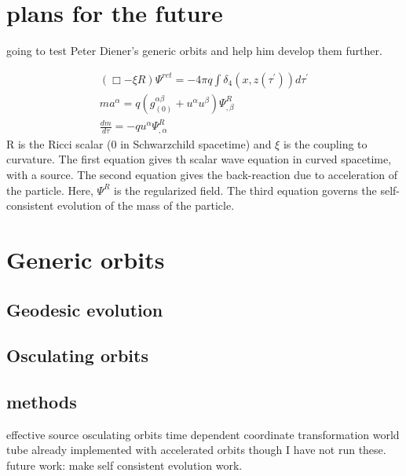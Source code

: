 \section{plans for the future}
going to test Peter Diener's generic orbits and help him develop them further.

\begin{eqnarray}
  (\Box - \xi R)\Psi^{ret} = -4\pi q \int\delta_4(x,z(\tau^\prime))d\tau^\prime\\
    ma^\alpha=q(g^{\alpha\beta}_{(0)}+u^\alpha u^\beta)\Psi^{R}_{,\beta}\\
    \frac{dm}{d\tau}=-q u^\alpha\Psi^R_{,\alpha}
\end{eqnarray}
R is the Ricci scalar (0 in Schwarzchild spacetime) and $\xi$ is the coupling to curvature. The first equation gives th scalar wave equation in curved spacetime, with a source. The second equation gives the back-reaction due to acceleration of the particle. Here, $\Psi^R$ is the regularized field. The third equation governs the self-consistent evolution of the mass of the particle.~\cite{WardellSelfForceReview}

\section{Generic orbits}
\subsection{Geodesic evolution}
\subsection{Osculating orbits}



\subsection{methods}
effective source
osculating orbits
time dependent coordinate transformation
world tube
already implemented with accelerated orbits though I have not run these.
future work: make self consistent evolution work. 

